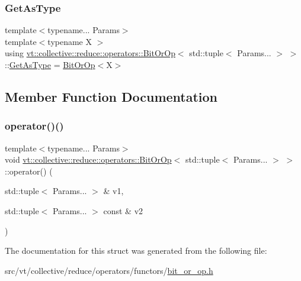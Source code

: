 \subsubsection{\texorpdfstring{Get\+As\+Type}{GetAsType}}
{\footnotesize\ttfamily template$<$typename... Params$>$ \\
template$<$typename X $>$ \\
using \hyperlink{structvt_1_1collective_1_1reduce_1_1operators_1_1_bit_or_op}{vt\+::collective\+::reduce\+::operators\+::\+Bit\+Or\+Op}$<$ std\+::tuple$<$ Params... $>$ $>$\+::\hyperlink{structvt_1_1collective_1_1reduce_1_1operators_1_1_bit_or_op_3_01std_1_1tuple_3_01_params_8_8_8_01_4_01_4_aefef184eae9e53940ca2c9bd67dd2d68}{Get\+As\+Type} =  \hyperlink{structvt_1_1collective_1_1reduce_1_1operators_1_1_bit_or_op}{Bit\+Or\+Op}$<$X$>$}



\subsection{Member Function Documentation}
\mbox{\label{structvt_1_1collective_1_1reduce_1_1operators_1_1_bit_or_op_3_01std_1_1tuple_3_01_params_8_8_8_01_4_01_4_ab80a95c40163cb3358bfeb1b004068b7}} 
\subsubsection{\texorpdfstring{operator()()}{operator()()}}
{\footnotesize\ttfamily template$<$typename... Params$>$ \\
void \hyperlink{structvt_1_1collective_1_1reduce_1_1operators_1_1_bit_or_op}{vt\+::collective\+::reduce\+::operators\+::\+Bit\+Or\+Op}$<$ std\+::tuple$<$ Params... $>$ $>$\+::operator() (\begin{DoxyParamCaption}\item[{std\+::tuple$<$ Params... $>$ \&}]{v1,  }\item[{std\+::tuple$<$ Params... $>$ const \&}]{v2 }\end{DoxyParamCaption})\hspace{0.3cm}{\ttfamily [inline]}}



The documentation for this struct was generated from the following file\+:\begin{DoxyCompactItemize}
\item 
src/vt/collective/reduce/operators/functors/\hyperlink{bit__or__op_8h}{bit\+\_\+or\+\_\+op.\+h}\end{DoxyCompactItemize}
